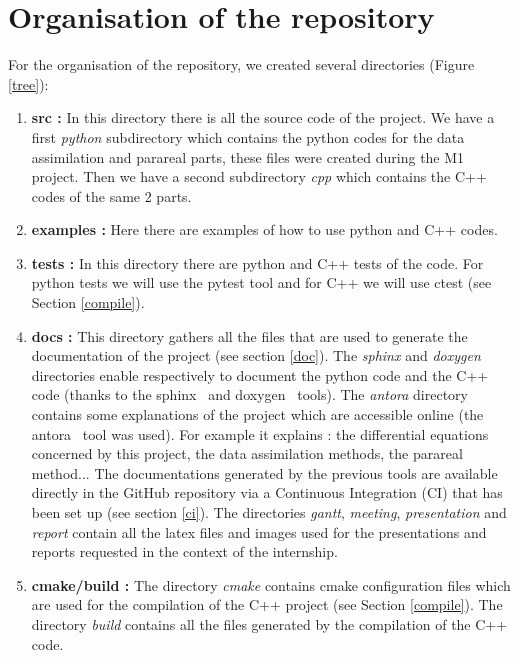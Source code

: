 \section{Organisation of the repository}

	\begin{minipage}{0.65\linewidth}
		For the organisation of the repository, we created several directories (Figure \ref{tree}):
		\begin{enumerate}[label=\textbullet]
			\item \textbf{src :} In this directory there is all the source code of the project. We have a first \textit{python} subdirectory which contains the python codes for the data assimilation and parareal parts, these files were created during the M1 project. Then we have a second subdirectory \textit{cpp} which contains the C++ codes of the same 2 parts.
			\item \textbf{examples :} Here there are examples of how to use python and C++ codes.
			\item \textbf{tests :} In this directory there are python and C++ tests of the code. For python tests we will use the pytest tool and for C++ we will use ctest (see Section \ref{compile}).
			\item \textbf{docs :} This directory gathers all the files that are used to generate the documentation of the project (see section \ref{doc}). The \textit{sphinx} and \textit{doxygen} directories enable respectively to document the python code and the C++ code (thanks to the sphinx~\cite{sphinx_doc} and doxygen~\cite{doxygen_doc} tools). The \textit{antora} directory contains some explanations of the project which are accessible online (the antora~\cite{antora_doc} tool was used). For example it explains : the differential equations concerned by this project, the data assimilation methods, the parareal method... The documentations generated by the previous tools are available directly in the GitHub repository via a Continuous Integration (CI) that has been set up (see section \ref{ci}).
			The directories \textit{gantt}, \textit{meeting}, \textit{presentation} and \textit{report} contain all the latex files and images used for the presentations and reports requested in the context of the internship.
			\item \textbf{cmake/build :} The directory \textit{cmake} contains cmake configuration files which are used for the compilation of the C++ project (see Section \ref{compile}). The directory \textit{build} contains all the files generated by the compilation of the C++ code.
		\end{enumerate}
	\end{minipage} \qquad
